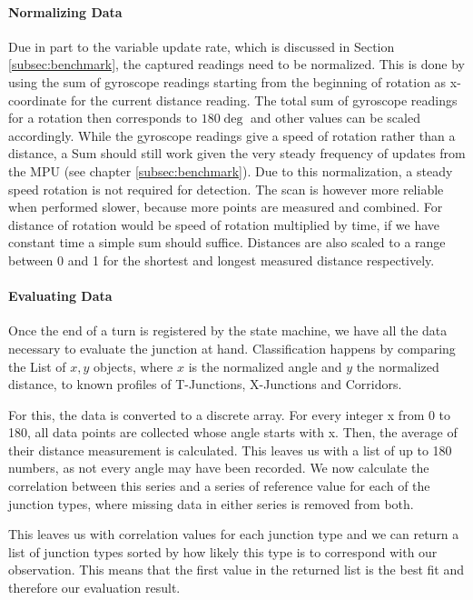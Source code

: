 \paragraph{Normalizing Data}
Due in part to the variable update rate, which is discussed in Section \ref{subsec:benchmark}, the captured readings need to be normalized.
This is done by using the sum of gyroscope readings starting from the beginning of rotation as x-coordinate for the current distance reading.
The total sum of gyroscope readings for a rotation then corresponds to $180\deg$ and other values can be scaled accordingly.
While the gyroscope readings give a speed of rotation rather than a distance, a Sum should still work given the very steady frequency of updates from the MPU (see chapter \ref{subsec:benchmark}).
Due to this normalization, a steady speed rotation is not required for detection. The scan is however more reliable when performed slower, because more points are measured and combined.
For distance of rotation would be speed of rotation multiplied by time, if we have constant time a simple sum should suffice.
Distances are also scaled to a range between 0 and 1 for the shortest and longest measured distance respectively.

\paragraph{Evaluating Data}
Once the end of a turn is registered by the state machine, we have all the data necessary to evaluate the junction at hand.
Classification happens by comparing the List of ${x,y}$ objects, where $x$ is the normalized angle and $y$ the normalized distance, to known profiles of T-Junctions, X-Junctions and Corridors.

For this, the data is converted to a discrete array. For every integer x from 0 to 180, all data points are collected whose angle starts with x. Then, the average of their distance measurement is calculated. This leaves us with a list of up to 180 numbers, as not every angle may have been recorded. We now calculate the correlation between this series and a series of reference value for each of the junction types, where missing data in either series is removed from both.

This leaves us with correlation values for each junction type and we can return a list of junction types sorted by how likely this type is to correspond with our observation. This means that the first value in the returned list is the best fit and therefore our evaluation result.

